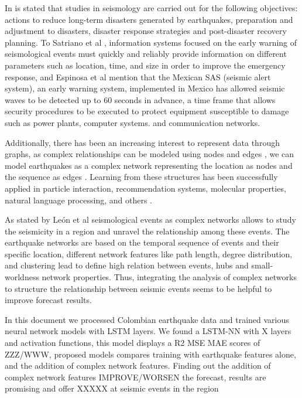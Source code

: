 \documentclass[sn-mathphys-num]{sn-jnl}
\begin{document}
In \cite{jiao_artificial_2020} is stated that studies in seismology are carried out for the following objectives: actions to reduce long-term disasters generated by earthquakes, preparation and adjustment to disasters, disaster response strategies and post-disaster recovery planning. To Satriano et al \cite{satriano_earthquake_2011}, information systems focused on the early warning of seismological events must quickly and reliably provide information on different parameters such as location, time, and size in order to improve the emergency response, and Espinosa et al \cite{espinosa-aranda_evolution_2009} mention that the Mexican SAS (seismic alert system), an early warning system, implemented in Mexico has allowed seismic waves to be detected up to 60 seconds in advance, a time frame that allows security procedures to be executed to protect equipment susceptible to damage such as power plants, computer systems. and communication networks.

Additionally, there has been an increasing interest to represent data through graphs, as complex relationships can be modeled using nodes and edges \cite{chami_machine_2021}, we can model earthquakes as a complex network representing the location as nodes and the sequence as edges \cite{leon_modeling_2018}. Learning from these structures has been successfully applied in particle interaction, recommendation systems, molecular properties, natural language processing, and others \cite{grattarola_graph_2020}.

As stated by León et al \cite{leon_modeling_2018}
seismological events as complex networks allows to study the seismicity in a region and unravel the relationship among these events. The earthquake networks are based on the temporal sequence of events and their specific location, different network features like path length, degree distribution, and clustering lead to define high relation between events, hubs and small-worldness network properties. Thus, integrating the analysis of complex networks to structure the relationship between seismic events seems to be helpful to improve forecast results.

In this document we processed Colombian earthquake data and trained various neural network models with LSTM layers. We found a LSTM-NN with X layers and activation functions, this model displays a R2 MSE MAE scores of ZZZ/WWW, proposed models compares training with earthquake features alone, and the addition of complex network features. Finding out the addition of complex network features IMPROVE/WORSEN the forecast, results are promising and offer XXXXX at seismic events in the region
\end{document}
